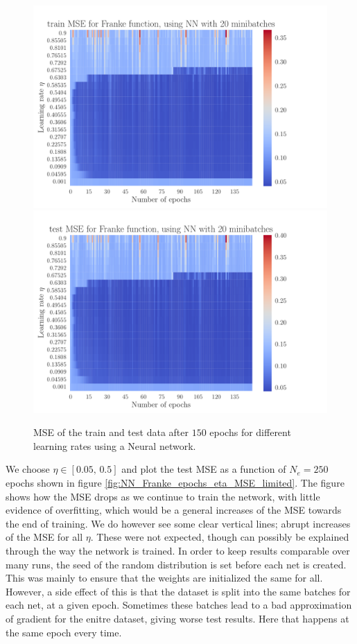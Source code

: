 \documentclass[12pt]{extarticle}
\begin{document}
\begin{figure}[h!]
	\includegraphics[width=\linewidth]{NN_Franke/NN_Franke__epochs_eta__train_MSE__569887.pdf}
	\includegraphics[width=\linewidth]{NN_Franke/NN_Franke__epochs_eta__test_MSE__271070.pdf}
	\caption{MSE of the train and test data after $150$ epochs for different learning rates using a Neural network.}
	\label{fig:NN_Franke_epochs_eta_MSE}
\end{figure}


We choose $\eta\in[0.05,\,0.5]$ and plot the test MSE as a function of $N_e=250$ epochs shown in figure \ref{fig:NN_Franke_epochs_eta_MSE_limited}. The figure shows how the MSE drops as we continue to train the network, with little evidence of overfitting, which would be a general increases of the MSE towards the end of training. We do however see some clear vertical lines; abrupt increases of the MSE for all $\eta$. These were not expected, though can possibly be explained through the way the network is trained. In order to keep results comparable over many runs, the seed of the random distribution is set before each net is created. This was mainly to ensure that the weights are initialized the same for all. However, a side effect of this is that the dataset is split into the same batches for each net, at a given epoch. Sometimes these batches lead to a bad approximation of gradient for the enitre dataset, giving worse test results. Here that happens at the same epoch every time.
\end{document}
